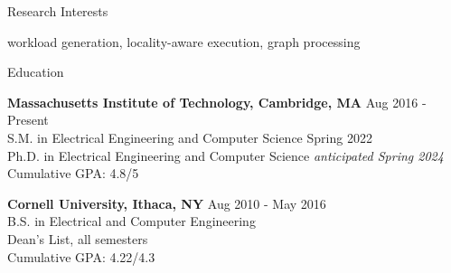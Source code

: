 \documentclass{resume} %
\begin{document}

\begin{rSection}{Research Interests}

workload generation, locality-aware execution, graph processing

\end{rSection}


\begin{rSection}{Education}

{\bf Massachusetts Institute of Technology, Cambridge, MA} \hfill { Aug 2016 - Present} \\ 
S.M. in Electrical Engineering and Computer Science \hfill {Spring 2022} \\
Ph.D. in Electrical Engineering and Computer Science \hfill { \it{anticipated} Spring 2024} \\
Cumulative GPA: 4.8/5

{\bf Cornell University, Ithaca, NY} \hfill { Aug 2010 - May 2016} \\ 
B.S. in Electrical and Computer Engineering \\
Dean's List, all semesters \\
Cumulative GPA: 4.22/4.3 

\end{rSection}

\end{document}

